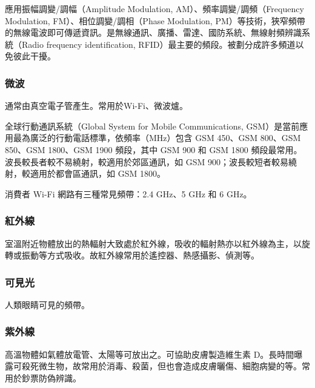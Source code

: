 \documentclass[a4paper,12pt]{report}
\begin{document}
\begin{itemize}
應用振幅調變/調幅（Amplitude Modulation, AM）、頻率調變/調頻（Frequency Modulation, FM）、相位調變/調相（Phase Modulation, PM）等技術，狹窄頻帶的無線電波即可傳遞資訊。是無線通訊、廣播、雷達、國防系統、無線射頻辨識系統（Radio frequency identification, RFID）最主要的頻段。被劃分成許多頻道以免彼此干擾。
\subsubsection{微波}
通常由真空電子管產生。常用於Wi-Fi、微波爐。

全球行動通訊系統（Global System for Mobile Communications, GSM）是當前應用最為廣泛的行動電話標準，依頻率（MHz）包含 GSM 450、GSM 800、GSM 850、GSM 1800、GSM 1900 頻段，其中 GSM 900 和 GSM 1800 頻段最常用。波長較長者較不易繞射，較適用於郊區通訊，如 GSM 900；波長較短者較易繞射，較適用於都會區通訊，如 GSM 1800。

消費者 Wi-Fi 網路有三種常見頻帶：2.4 GHz、5 GHz 和 6 GHz。
\subsubsection{紅外線}
室溫附近物體放出的熱輻射大致處於紅外線，吸收的輻射熱亦以紅外線為主，以旋轉或振動等方式吸收。故紅外線常用於遙控器、熱感攝影、偵測等。
\subsubsection{可見光}
人類眼睛可見的頻帶。
\subsubsection{紫外線}
高溫物體如氣體放電管、太陽等可放出之。可協助皮膚製造維生素 D。長時間曝露可殺死微生物，故常用於消毒、殺菌，但也會造成皮膚曬傷、細胞病變的等。常用於鈔票防偽辨識。

\end{itemize}
\end{document}
